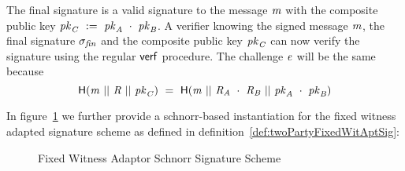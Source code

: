 The final signature is a valid signature to the message $\mathit{m}$ with the composite public key $\mathit{pk}_{\mathit{C}} ~:=~ \mathit{pk}_{\mathit{A}} ~\cdot~ \mathit{pk}_{\mathit{B}}$.
A verifier knowing the signed message $\mathit{m}$, the final signature $\sigma_{\mathit{fin}}$ and the composite public key $\mathit{pk}_{\mathit{C}}$ can now verify the signature using the regular $\mathsf{verf}$ procedure.
The challenge $\mathit{e}$ will be the same because
\[ \mathsf{H} (\mathit{m} ~||~ \mathit{R} ~||~ \mathit{pk}_{\mathit{C}}) ~=~ \mathsf{H} (\mathit{m} ~||~ \mathit{R}_{\mathit{A}} ~\cdot~ \mathit{R}_{\mathit{B}} ~||~ \mathit{pk}_{\mathit{A}} ~\cdot~ \mathit{pk}_{\mathit{B}}) \]

In figure~\ref{fig:aptSchnorr} we further provide a schnorr-based instantiation for the fixed witness adapted signature scheme as defined in definition~\ref{def:twoPartyFixedWitAptSig}:

\begin{figure}
    \begin{center}
        \fbox{
        \begin{varwidth}{\textwidth}
            \procedure[linenumbering]{$\procAptSig{\varSigPt}{\varWit}$}{
            (\varS \opSeperate \varRand) \opFunResult \varSigPt \\
            \varSStar \opAssign \varS \opAddScalar \varWit \\
            \pcreturn \varSigApt \opAssign (\varSStar \opSeperate \varRand)
            } \\
            \procedure[linenumbering]{$\procVerifyAptSig{\varSigAptBob}{\varMsg}{\varPubKeyBob}{\varStatement}$} {
            (\varSBob \opSeperate \varRandBob) \opFunResult \varSigAptBob \\
            \varRand \opAssign \varRandAlice \opAddPoint \varRandBob \\
            \varPubKeyComp \opAssign \varPubKeyAlice \opAddPoint \varPubKeyBob \\
            \varSchnorrChallenge \opAssign \funHash{\varMsg \opConc \varRand \opConc \varPubKeyComp} \\
            \pcreturn \funGen{\varSBob} \opEq \varRandBob^\varSchnorrChallenge \opAddPoint \varPubKeyBob \opAddPoint \varStatement
            }
            \procedure[linenumbering]{$\procExtWit{\varSigFin}{\varSigAlice}{\varSigAptBob}$}{
            (\varS \opSeperate \varRand) \opFunResult \varSigFin \\
            (\varSAlice \opSeperate \varRandAlice) \opFunResult \varSigAlice \\
            (\funStar{\varSBob} \opSeperate \varRandBob) \opFunResult \varSigAptBob \\
            \varSBob \opAssign \varS \opSub \varSAlice \\
            \varWit \opAssign \funStar{\varSigBob} \opSub \varSigBob \\
            \pcreturn (\varWit)
            }
        \end{varwidth}
        }
    \end{center}
    \caption{Fixed Witness Adaptor Schnorr Signature Scheme}
    \label{fig:aptSchnorr}
\end{figure}

